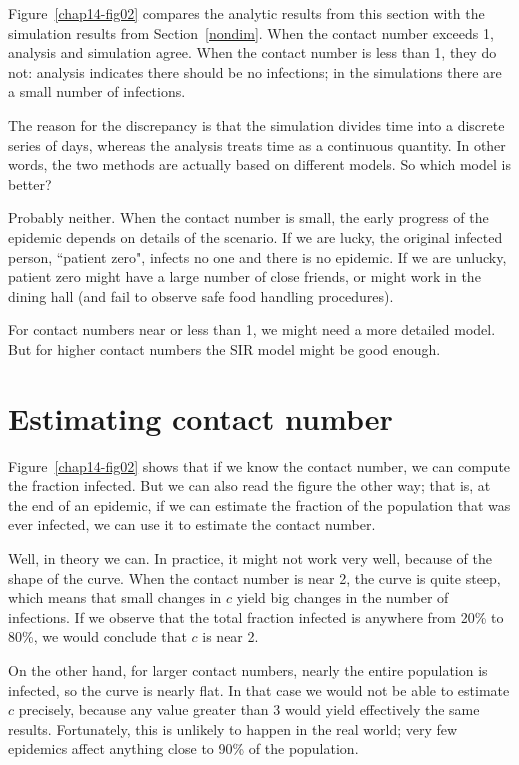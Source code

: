 \documentclass[12pt]{book}
\theoremstyle{exercise}
\begin{document}
Figure~\ref{chap14-fig02} compares the analytic results from this section with the simulation results from Section~\ref{nondim}.  When the contact number exceeds 1, analysis and simulation agree.
When the contact number is less than 1, they do not: analysis indicates there should be no infections; in the simulations there are a small number of infections.

The reason for the discrepancy is that the simulation divides time into a discrete series of days, whereas the analysis treats time as a continuous quantity.  In other words, the two methods are actually based on different models.  So which model is better?

Probably neither.  When the contact number is small, the early progress of the epidemic depends on details of the scenario.  If we are lucky, the original infected person, ``patient zero",  infects no one and there is no epidemic.  If we are unlucky, patient zero might have a large number of close friends, or might work in the dining hall (and fail to observe safe food handling procedures).

For contact numbers near or less than 1, we might need a more detailed model.  But for higher contact numbers the SIR model might be good enough.

\section{Estimating contact number}

Figure~\ref{chap14-fig02} shows that if we know the contact number, we can compute the fraction infected.  But we can also read the figure the other way; that is, at the end of an epidemic, if we can estimate the fraction of the population that was ever infected, we can use it to estimate the contact number.

Well, in theory we can.  In practice, it might not work very well, because of the shape of the curve.  When the contact number is near 2, the curve is quite steep, which means that small changes in $c$ yield big changes in the number of infections.  If we observe that the total fraction infected is anywhere from 20\% to 80\%, we would conclude that $c$ is near 2.

On the other hand, for larger contact numbers, nearly the entire population is infected, so the curve is nearly flat.  In that case we would not be able to estimate $c$ precisely, because any value greater than 3 would yield effectively the same results.  Fortunately, this is unlikely to happen in the real world; very few epidemics affect anything close to 90\% of the population.
\end{document}
